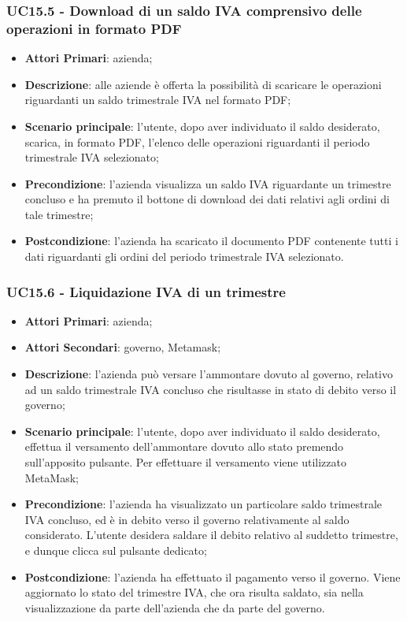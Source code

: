 \subsubsection{UC15.5 - Download di un saldo IVA comprensivo delle operazioni in formato PDF}
\begin{itemize}
	\item \textbf{Attori Primari}: azienda;
	\item \textbf{Descrizione}: alle aziende è offerta la possibilità di scaricare le operazioni riguardanti un saldo trimestrale IVA nel formato PDF;
	\item \textbf{Scenario principale}: l'utente, dopo aver individuato il saldo desiderato, scarica, in formato PDF, l'elenco delle operazioni riguardanti il periodo trimestrale IVA selezionato;
	\item \textbf{Precondizione}: l'azienda visualizza un saldo IVA riguardante un trimestre concluso e ha premuto il bottone di download dei dati relativi agli ordini di tale trimestre;
	\item \textbf{Postcondizione}: l'azienda ha scaricato il documento PDF contenente tutti i dati riguardanti gli ordini del periodo trimestrale IVA selezionato.
\end{itemize} 

\subsubsection{UC15.6 - Liquidazione IVA di un trimestre}
\begin{itemize}
	\item \textbf{Attori Primari}: azienda;
	\item \textbf{Attori Secondari}: governo, Metamask\glo;
	\item \textbf{Descrizione}: l'azienda può versare l'ammontare dovuto al governo, relativo ad un saldo trimestrale IVA concluso che risultasse in stato di debito verso il governo;
	\item \textbf{Scenario principale}: l'utente, dopo aver individuato il saldo desiderato, effettua il versamento dell'ammontare dovuto allo stato premendo sull'apposito pulsante. Per effettuare il versamento viene utilizzato MetaMask\glo;
	\item \textbf{Precondizione}: l'azienda ha visualizzato un particolare saldo trimestrale IVA concluso, ed è in debito verso il governo relativamente al saldo considerato. L'utente desidera saldare il debito relativo al suddetto trimestre, e dunque clicca sul pulsante dedicato;
	\item \textbf{Postcondizione}: l'azienda ha effettuato il pagamento verso il governo. Viene aggiornato lo stato del trimestre IVA, che ora risulta saldato, sia nella visualizzazione da parte dell'azienda che da parte del governo.
\end{itemize} 

